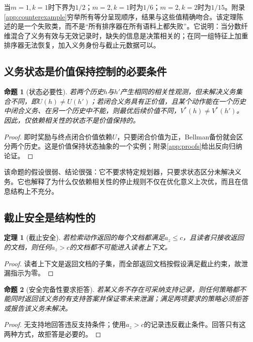 \documentclass[10.5pt,a4paper]{ctexart}
\newtheorem{theorem}{定理}
\newtheorem{proposition}{命题}
\begin{document}
当$m=1,k=1$时下界为$1/2$；$m=2,k=1$时为$1/6$；$m=2,k=2$时为$1/15$。附录\ref{app:counterexample}穷举所有等分呈现顺序，结果与这些值精确吻合。该定理陈述的是一个失败类，而不是“所有排序器在所有语料上都失败”。它说明：当分数纤维混合了义务有效与无效记录时，缺失的信息是决策相关的；在同一组特征上加重排序器无法恢复，加入义务身份与截止元数据可以。

\subsection{义务状态是价值保持控制的必要条件}
\begin{proposition}[状态必要性]
\label{prop:state}
若两个历史$h$与$h'$产生相同的相关性观测，但未解决义务集合不同，即$U(h)\neq U(h')$；若闭合义务具有正价值，且某个动作能在一个历史中闭合义务、在另一个历史中不能，则最优后续价值不同，$V^*(h)\neq V^*(h')$。因此，仅依赖相关性的状态不是价值保持的。
\end{proposition}
\begin{proof}
即时奖励与终点闭合价值依赖$U$，只要闭合价值为正，Bellman备份就会区分两个历史。这是价值保持状态抽象的一个实例\citep{li2006abstraction,abel2020abstraction}；附录\ref{app:proofs}给出反向归纳论证。
\end{proof}

该命题的假设很弱、结论很强：它不要求特定规划器，只要求状态区分未解决义务。它也解释了为什么仅依赖相关性的停止规则不仅在优化意义上次优，而且在信息结构上不充分。

\subsection{截止安全是结构性的}
\begin{theorem}[截止安全]
\label{thm:cutoff}
若检索动作返回的每个文档都满足$a_z\le c$，且读者只接收返回的文档，则任何$a_z>c$的文档都不可能进入读者上下文。
\end{theorem}
\begin{proof}
读者上下文是返回文档的子集，而全部返回文档按假设满足截止约束，故泄漏指示为零。
\end{proof}

\begin{proposition}[安全完备性要求拒答]
\label{prop:abstain}
若某义务不存在可采纳支持记录，则任何策略都不能同时返回该义务的有支持答案并保证零未来泄漏；满足两项要求的策略必须拒答或报告该义务未解决。
\end{proposition}
\begin{proof}
无支持地回答违反支持条件；使用$a_z>c$的记录违反截止条件。回答只有这两种方式，故拒答是必要的。
\end{proof}
\end{document}
